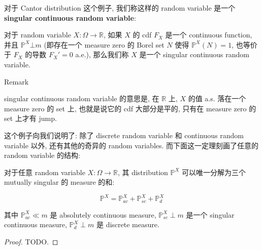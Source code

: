 对于 Cantor distribution 这个例子, 我们称这样的 random variable 是一个 \textbf{singular continuous random variable}:

\begin{definition}{}

对于 random variable \(\mathit{X}:\Omega\rightarrow\mathbb{R}\), 如果 \(\mathit{X}\) 的 cdf \(\mathit{F}_{\mathit{X}}\) 是一个 continuous function, 并且 \(\mathbb{P}^{\mathit{X}}\bot\mathit{m}\) (即存在一个 measure zero 的 Borel set \(\mathit{N}\) 使得 \(\mathbb{P}^{\mathit{X}}(\mathit{N}) = 1\), 也等价于 \(\mathit{F}_{\mathit{X}}\) 的导数 \(\mathit{F}_{\mathit{X}}' = 0\) a.e.), 那么我们称 \(\mathit{X}\) 是一个 singular continuous random variable.

\end{definition}

\begin{qlremark}{Remark}

singular continuous random variable 的意思是, 在 \(\mathbb{R}\) 上, \(\mathit{X}\) 的值 a.s. 落在一个 measure zero 的 set 上, 也就是说它的 cdf 大部分是平的, 只有在 measure zero 的 set 上才有 jump.

\end{qlremark}

这个例子向我们说明了: 除了 discrete random variable 和 continuous random variable 以外, 还有其他的奇异的 random variables. 而下面这一定理刻画了任意的 random variable 的结构:

\begin{theorem}{}

对于任意 random variable \(\mathit{X}:\Omega\rightarrow\mathbb{R}\), 其 distribution \(\mathbb{P}^{\mathit{X}}\) 可以唯一分解为三个 mutually singular 的 measure 的和:

\[\mathbb{P}^{\mathit{X}} = \mathbb{P}_{\mathit{a}\mathit{c}}^{\mathit{X}} + \mathbb{P}_{\mathit{s}\mathit{c}}^{\mathit{X}} + \mathbb{P}_{\mathit{d}}^{\mathit{X}}\]

其中 \(\mathbb{P}_{\mathit{a}\mathit{c}}^{\mathit{X}} \ll \mathit{m}\) 是 absolutely continuous measure, \(\mathbb{P}_{\mathit{s}\mathit{c}}^{\mathit{X}} \perp \mathit{m}\) 是一个 singular continuous measure, \(\mathbb{P}_{\mathit{d}}^{\mathit{X}} \perp \mathit{m}\) 是 discrete measure.

\end{theorem}

\begin{proof}

TODO.

\end{proof}

